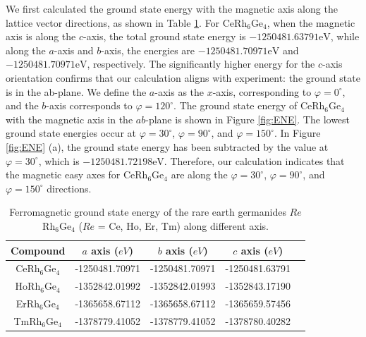 \documentclass[preprint,12pt]{elsarticle}
\begin{document}
We first calculated the ground state energy with the magnetic axis along the lattice vector directions, as shown in Table \ref{tab:table2}. For CeRh$_6$Ge$_4$, when the magnetic axis is along the $c$-axis, the total ground state energy is $-1250481.63791 \mathrm{eV}$, while along the $a$-axis and $b$-axis, the energies are $-1250481.70971 \mathrm{eV}$ and $-1250481.70971 \mathrm{eV}$, respectively. The significantly higher energy for the $c$-axis orientation confirms that our calculation aligns with experiment: the ground state is in the ab-plane. We define the $a$-axis as the $x$-axis, corresponding to $\varphi=0^{\circ}$, and the $b$-axis corresponds to $\varphi = 120^{\circ}$. The ground state energy of CeRh$_6$Ge$_4$ with the magnetic axis in the $ab$-plane is shown in Figure \ref{fig:ENE}. The lowest ground state energies occur at $\varphi=30^{\circ}$, $\varphi=90^{\circ}$, and $\varphi=150^{\circ}$. In Figure \ref{fig:ENE} (a), the ground state energy has been subtracted by the value at $\varphi = 30^{\circ}$, which is $-1250481.72198 \mathrm{eV}$. Therefore, our calculation indicates that the magnetic easy axes for CeRh$_6$Ge$_4$ are along the $\varphi=30^{\circ}$, $\varphi=90^{\circ}$, and $\varphi=150^{\circ}$ directions.
	\begin{table}%
		\caption{\label{tab:table2}%
			Ferromagnetic ground state energy of the rare earth germanides $Re$Rh$_6$Ge$_4$ ($Re$ = Ce, Ho, Er, Tm) along different axis. }
			\begin{tabular}{ccccc}
				\toprule
                Compound & $a$ axis ($eV$)  & $b$ axis ($eV$)   & $c$ axis ($eV$)    \\ \hline   
				CeRh$_6$Ge$_4$ & -1250481.70971 & -1250481.70971 & -1250481.63791 \\
				HoRh$_6$Ge$_4$ & -1352842.01992 & -1352842.01993 & -1352843.17190 \\
				ErRh$_6$Ge$_4$ & -1365658.67112 & -1365658.67112 & -1365659.57456 \\
				TmRh$_6$Ge$_4$ & -1378779.41052 & -1378779.41052 & -1378780.40282 \\
				\bottomrule
			\end{tabular}
	\end{table}
\end{document}
